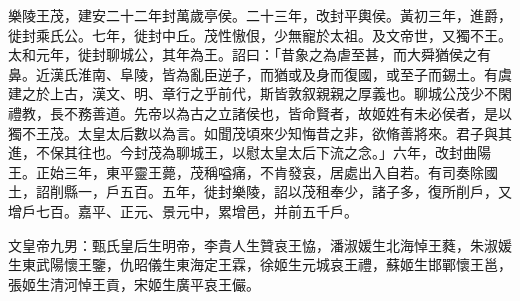 
\begin{pinyinscope}
樂陵王茂，建安二十二年封萬歲亭侯。二十三年，改封平輿侯。黃初三年，進爵，徙封乘氏公。七年，徙封中丘。茂性慠佷，少無寵於太祖。及文帝世，又獨不王。太和元年，徙封聊城公，其年為王。詔曰：「昔象之為虐至甚，而大舜猶侯之有鼻。近漢氏淮南、阜陵，皆為亂臣逆子，而猶或及身而復國，或至子而錫土。有虞建之於上古，漢文、明、章行之乎前代，斯皆敦叙親親之厚義也。聊城公茂少不閑禮教，長不務善道。先帝以為古之立諸侯也，皆命賢者，故姬姓有未必侯者，是以獨不王茂。太皇太后數以為言。如聞茂頃來少知悔昔之非，欲脩善將來。君子與其進，不保其往也。今封茂為聊城王，以慰太皇太后下流之念。」六年，改封曲陽王。正始三年，東平靈王薨，茂稱嗌痛，不肯發哀，居處出入自若。有司奏除國土，詔削縣一，戶五百。五年，徙封樂陵，詔以茂租奉少，諸子多，復所削戶，又增戶七百。嘉平、正元、景元中，累增邑，并前五千戶。

文皇帝九男：甄氏皇后生明帝，李貴人生贊哀王恊，潘淑媛生北海悼王蕤，朱淑媛生東武陽懷王鑒，仇昭儀生東海定王霖，徐姬生元城哀王禮，蘇姬生邯鄲懷王邕，張姬生清河悼王貢，宋姬生廣平哀王儼。


\end{pinyinscope}